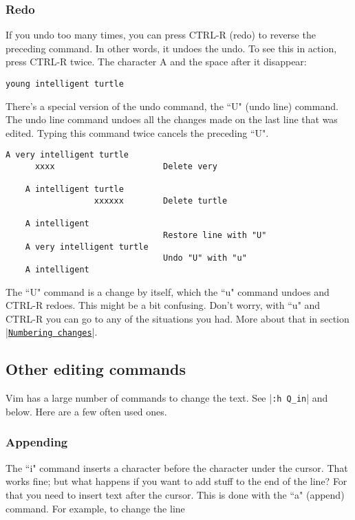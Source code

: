 \subsubsection{Redo}

If you undo too many times, you can press CTRL-R (redo) to reverse the preceding command.
In other words, it undoes the undo.
To see this in action, press CTRL-R twice.
The character A and the space after it disappear:

		\begin{Verbatim}[samepage=true]
    young intelligent turtle
		\end{Verbatim}

There's a special version of the undo command, the ``U" (undo line) command.
The undo line command undoes all the changes made on the last line that was edited.
Typing this command twice cancels the preceding ``U".

		\begin{Verbatim}[samepage=true]
    A very intelligent turtle
      xxxx                      Delete very

    A intelligent turtle
                  xxxxxx        Delete turtle

    A intelligent
                                Restore line with "U"
    A very intelligent turtle
                                Undo "U" with "u"
    A intelligent
		\end{Verbatim}

The ``U" command is a change by itself, which the ``u" command undoes and CTRL-R redoes.
This might be a bit confusing.
Don't worry, with ``u" and CTRL-R you can go to any of the situations you had.
More about that in section |\hyperref[Numbering changes]{\texttt{Numbering changes}}|.

\subsection{Other editing commands}

Vim has a large number of commands to change the text.
See |\texttt{:h Q\_in}| and below.
Here are a few often used ones.

\subsubsection{Appending}

The ``i" command inserts a character before the character under the cursor.
That works fine; but what happens if you want to add stuff to the end of the line?  For that you need to insert text after the cursor.
This is done with the ``a" (append) command.
For example, to change the line

